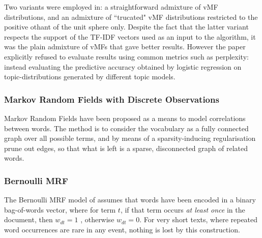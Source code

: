 Two variants were employed in\cite{Reisinger2010}: a straightforward admixture of vMF distributions, and an admixture of ``trucated" vMF distributions restricted to the positive othant of the unit sphere only. Despite the fact that the latter variant respects the support of the TF-IDF vectors used as an input to the algorithm, it was the plain admixture of vMFs that gave better results. However the paper explicitly refused to evaluate results using common metrics such as perplexity: instead evaluating the predictive accuracy obtained by logistic regression on topic-distributions generated by different topic models.

\subsubsection*{Markov Random Fields with Discrete Observations}
Markov Random Fields have been proposed as a means to  model correlations between words. The method is to consider the vocabulary as a fully connected graph over all possible terms, and by means of a sparsity-inducing regularisation prune out edges, so that what is left is a sparse, disconnected graph of related words.

%
%

\subsubsection*{Bernoulli MRF}
The Bernoulli MRF model of \cite{Nallapati2007} assumes that words have been encoded in a binary bag-of-words vector, where for term $t$, if that term occurs \emph{at least once} in the document, then $w_{dt} = 1$ , otherwise $w_{dt} = 0$. For very short texts, where repeated word occurrences are rare in any event, nothing is lost by this construction.

